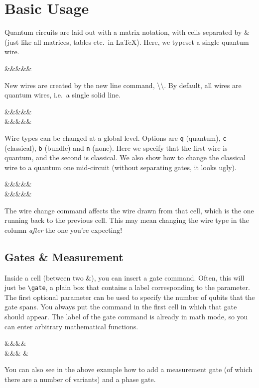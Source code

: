 \documentclass[aps,pra,10pt,nofootinbib]{revtex4-2}
\begin{document}
\section{Basic Usage}

Quantum circuits are laid out with a matrix notation, with cells separated by \& (just like all matrices, tables etc.\ in \LaTeX). Here, we typeset a single quantum wire.
\begin{Code}
\begin{quantikz}
&&&&&
\end{quantikz}
\end{Code}

New wires are created by the new line command, \textbackslash\textbackslash. By default, all wires are quantum wires, i.e.\ a single solid line.
\begin{Code}
\begin{quantikz}
&&&&& \\
&&&&&
\end{quantikz}
\end{Code}
Wire types can be changed at a global level. Options are \texttt{q} (quantum), \texttt{c} (classical), \texttt{b} (bundle) and \texttt{n} (none). Here we specify that the first wire is quantum, and the second is classical. We also show how to change the classical wire to a quantum one mid-circuit (without separating gates, it looks ugly).
\begin{Code}
\begin{quantikz}[wire types={q,c}]
&&&&& \\
&&&&&
\end{quantikz}
\end{Code}
The wire change command affects the wire drawn from that cell, which is the one running back to the previous cell. This may mean changing the wire type in the column \emph{after} the one you're expecting!

\subsection{Gates \& Measurement}

Inside a cell (between two \&), you can insert a gate command. Often, this will just be \verb|\gate|, a plain box that contains a label corresponding to the parameter. The first optional parameter can be used to specify the number of qubits that the gate spans. You always put the command in the first cell in which that gate should appear. The label of the gate command is already in math mode, so you can enter arbitrary mathematical functions.
\begin{Code}
\begin{quantikz}
&&&& \meter{} \\
&&&\phase{\alpha} &
\end{quantikz}
\end{Code}
You can also see in the above example how to add a measurement gate (of which there are a number of variants) and a phase gate.
\end{document}
